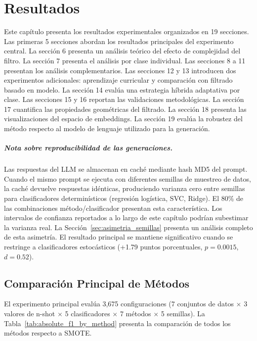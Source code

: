 
\chapter{Resultados}
\label{ch:resultados}

Este capítulo presenta los resultados experimentales organizados en 19 secciones. Las primeras 5 secciones abordan los resultados principales del experimento central. La sección 6 presenta un análisis teórico del efecto de complejidad del filtro. La sección 7 presenta el análisis por clase individual. Las secciones 8 a 11 presentan los análisis complementarios. Las secciones 12 y 13 introducen dos experimentos adicionales: aprendizaje curricular y comparación con filtrado basado en modelo. La sección 14 evalúa una estrategia híbrida adaptativa por clase. Las secciones 15 y 16 reportan las validaciones metodológicas. La sección 17 cuantifica las propiedades geométricas del filtrado. La sección 18 presenta las visualizaciones del espacio de embeddings. La sección 19 evalúa la robustez del método respecto al modelo de lenguaje utilizado para la generación.

\paragraph{Nota sobre reproducibilidad de las generaciones.} Las respuestas del LLM se almacenan en caché mediante hash MD5 del prompt. Cuando el mismo prompt se ejecuta con diferentes semillas de muestreo de datos, la caché devuelve respuestas idénticas, produciendo varianza cero entre semillas para clasificadores determinísticos (regresión logística, SVC, Ridge). El 80\% de las combinaciones método/clasificador presentan esta característica. Los intervalos de confianza reportados a lo largo de este capítulo podrían subestimar la varianza real. La Sección~\ref{sec:asimetria_semillas} presenta un análisis completo de esta asimetría. El resultado principal se mantiene significativo cuando se restringe a clasificadores estocásticos (+1.79 puntos porcentuales, $p = 0.0015$, $d = 0.52$).

\section{Comparación Principal de Métodos}
\label{sec:comparacion_principal}

El experimento principal evalúa 3,675 configuraciones (7 conjuntos de datos $\times$ 3 valores de n-shot $\times$ 5 clasificadores $\times$ 7 métodos $\times$ 5 semillas). La Tabla~\ref{tab:absolute_f1_by_method} presenta la comparación de todos los métodos respecto a SMOTE.

